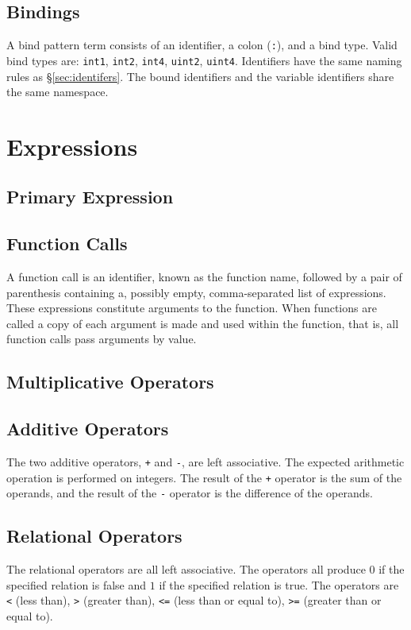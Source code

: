 \documentclass[letterpaper]{article}
\begin{document}
\subsection{Bindings}
A bind pattern term consists of an identifier, a colon (\texttt{:}), and a bind type.  Valid bind types are: \texttt{int1}, \texttt{int2}, \texttt{int4}, \texttt{uint2}, \texttt{uint4}.  Identifiers have the same naming rules as \S\ref{sec:identifers}.  The bound identifiers and the variable identifiers share the same namespace.

\section{Expressions}
\label{sec:expressions}

\subsection{Primary Expression}

\subsection{Function Calls}
A function call is an identifier, known as the function name, followed by a pair of parenthesis containing a, possibly empty, comma-separated list of expressions.  These expressions constitute arguments to the function.  When functions are called a copy of each argument is made and used within the function, that is, all function calls pass arguments by value.

\subsection{Multiplicative Operators}

\subsection{Additive Operators}
The two additive operators, \texttt{+} and \texttt{-}, are left associative.  The expected arithmetic operation is performed on integers.  The result of the \texttt{+} operator is the sum of the operands, and the result of the \texttt{-} operator is the difference of the operands.


\subsection{Relational Operators}
The relational operators are all left associative.  The operators all produce $0$ if the specified relation is false and $1$ if the specified relation is true.  The operators are \texttt{<} (less than), \texttt{>} (greater than), \texttt{<=} (less than or equal to), \texttt{>=} (greater than or equal to).
\end{document}
